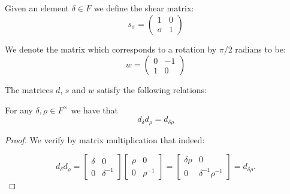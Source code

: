 \begin{definition}
\label{SpecialMatrices.d}
\leanok
    Given an element $\delta \in F$ we define the shear matrix:
    \[
    s_\sigma  = \begin{pmatrix}
    1 & 0\\
    \sigma & 1
    \end{pmatrix}
    \]
\end{definition}

\begin{definition}
\label{SpecialMatrices.w}
\leanok
 We denote the matrix which corresponds to a rotation by $\pi / 2$ radians to be:
 \[
 w = \begin{pmatrix}
    0 & -1\\
    1 & 0
 \end{pmatrix}
 \]
\end{definition}

The matrices $d$, $s$ and $w$ satisfy the following relations:


\begin{lemma}
\label{SpecialMatrices.d_mul_d_eq_d_mul}
\leanok
For any $\delta, \rho \in F^\times$ we have that
\[
d_\delta d_\rho = d_{\delta\rho}
\]
\end{lemma}
\begin{proof}
    We verify by matrix multiplication that indeed:

    \begin{equation*}
        d_\delta d_\rho = \begin{bmatrix} \delta & 0 \\ 0 & \delta^{-1} \end{bmatrix} \begin{bmatrix} \rho & 0 \\ 0 & \rho^{-1} \end{bmatrix} = \begin{bmatrix} \delta \rho & 0 \\ 0 & \delta^{-1} \rho^{-1} \end{bmatrix} = d_{\delta \rho}.
    \end{equation*}
\end{proof}


